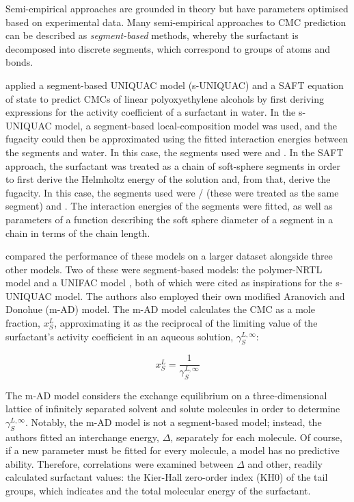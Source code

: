 Semi-empirical approaches are grounded in theory but have parameters optimised based on experimental data. Many semi-empirical approaches to CMC prediction can be described as \emph{segment-based} methods, whereby the surfactant is decomposed into discrete segments, which correspond to groups of atoms and bonds.

\citet{liStudiesUNIQUACSAFT1998} applied a segment-based UNIQUAC model (s-UNIQUAC) and a SAFT equation of state to predict CMCs of linear polyoxyethylene alcohols by first deriving expressions for the activity coefficient of a surfactant in water. In the s-UNIQUAC model, a segment-based local-composition model was used, and the fugacity could then be approximated using the fitted interaction energies between the segments and water. In this case, the segments used were  and . In the SAFT approach, the surfactant was treated as a chain of soft-sphere segments in order to first derive the Helmholtz energy of the solution and, from that, derive the fugacity. In this case, the segments used were / (these were treated as the same segment) and . The interaction energies of the segments were fitted, as well as parameters of a function describing the soft sphere diameter of a segment in a chain in terms of the chain length.

\citet{chengCorrelationCriticalMicelle2005} compared the performance of these models on a larger dataset alongside three other models. Two of these were segment-based models: the polymer-NRTL model \cite{liStudiesUNIQUACSAFT1998} and
a UNIFAC model \cite{voutsasPredictionCriticalMicelle2001}, both of which were cited as inspirations for the s-UNIQUAC model. The authors also employed their own modified Aranovich and Donohue (m-AD) model. The m-AD model calculates the
CMC as a mole fraction, $x_S^L$, approximating it as the reciprocal of the limiting value of the surfactant's activity coefficient in an aqueous solution,
$\gamma_S^{L,\infty}$:

\begin{equation}
    \label{eq:m-AD}
    x_S^L = \frac{1}{\gamma_S^{L,\infty}}
\end{equation}

The m-AD model considers the exchange equilibrium on a three-dimensional lattice of infinitely separated solvent and solute molecules in order to determine $\gamma_S^{L,\infty}$. Notably, the m-AD model is not a segment-based model;
instead, the authors fitted an interchange energy, $\Delta$, separately for each molecule. Of course, if a new parameter must be fitted for every molecule, a model has no predictive ability. Therefore, correlations were examined between
$\Delta$ and other, readily calculated surfactant values: the Kier-Hall zero-order index (KH0) of the tail groups, which indicates  and the total molecular energy of the surfactant.

